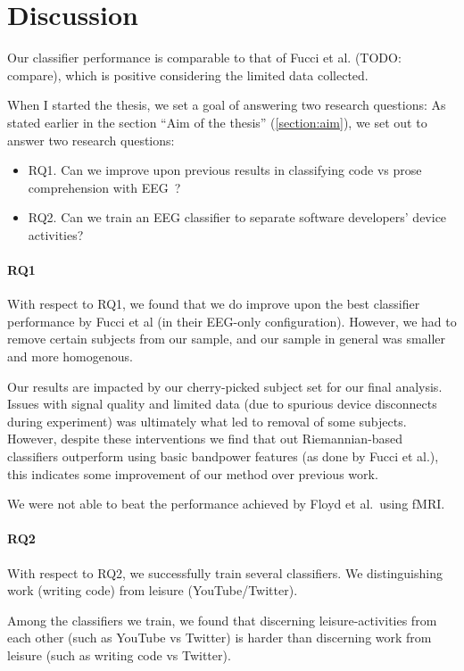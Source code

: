 \section{Discussion}\label{section:discussion}

Our classifier performance is comparable to that of Fucci et al. (TODO: compare), which is positive considering the limited data collected.

When I started the thesis, we set a goal of answering two research questions:
As stated earlier in the section ``Aim of the thesis'' (\ref{section:aim}), we set out to answer two research questions:

\begin{itemize}
        \item RQ1. Can we improve upon previous results in classifying code vs prose comprehension with EEG~?
        \item RQ2. Can we train an EEG classifier to separate software developers’ device activities?
\end{itemize}

\paragraph*{RQ1}
With respect to RQ1, we found that we do improve upon the best classifier performance by Fucci et al (in their EEG-only configuration). However, we had to remove certain subjects from our sample, and our sample in general was smaller and more homogenous. 

Our results are impacted by our cherry-picked subject set for our final analysis. Issues with signal quality and limited data (due to spurious device disconnects during experiment) was ultimately what led to removal of some subjects. However, despite these interventions we find that out Riemannian-based classifiers outperform using basic bandpower features (as done by Fucci et al.), this indicates some improvement of our method over previous work.

We were not able to beat the performance achieved by Floyd et al.\ using fMRI\@.

\paragraph*{RQ2}
With respect to RQ2, we successfully train several classifiers. We distinguishing work (writing code) from leisure (YouTube/Twitter). 

Among the classifiers we train, we found that discerning leisure-activities from each other (such as YouTube vs Twitter) is harder than discerning work from leisure (such as writing code vs Twitter).

